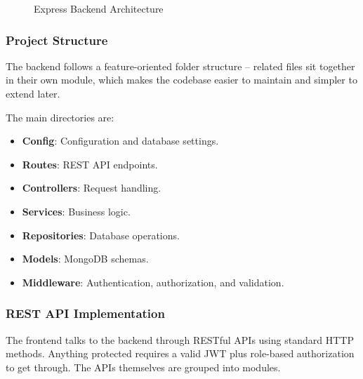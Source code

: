 \begin{figure}[ht]
{
}
\caption{Express Backend Architecture}
\label{fig:express_backend}
\end{figure}

\subsubsection{Project Structure}

The backend follows a feature-oriented folder structure -- related files sit together in their own module, which makes the codebase easier to maintain and simpler to extend later.

The main directories are:

\begin{itemize}
\item \textbf{Config}: Configuration and database settings.
\item \textbf{Routes}: REST API endpoints.
\item \textbf{Controllers}: Request handling.
\item \textbf{Services}: Business logic.
\item \textbf{Repositories}: Database operations.
\item \textbf{Models}: MongoDB schemas.
\item \textbf{Middleware}: Authentication, authorization, and validation.
\end{itemize}

\subsubsection{REST API Implementation}

The frontend talks to the backend through RESTful APIs using standard HTTP methods. Anything protected requires a valid JWT plus role-based authorization to get through. The APIs themselves are grouped into modules.

